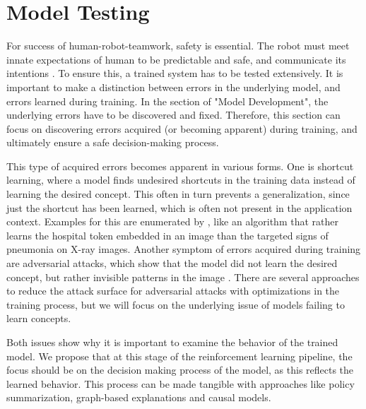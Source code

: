 \documentclass[twoside,11pt]{article}
\begin{document}
\section{Model Testing}
For success of human-robot-teamwork, safety is essential. The robot must meet innate expectations of human to be predictable and safe, and communicate its intentions \cite{EderHarperLeonards:2014:HITLRoboticsSafetyAssurance}. To ensure this, a trained system has to be tested extensively. It is important to make a distinction between errors in the underlying model, and errors learned during training. In the section of "Model Development", the underlying errors have to be discovered and fixed. Therefore, this section can focus on discovering errors acquired (or becoming apparent) during training, and ultimately ensure a safe decision-making process.

This type of acquired errors becomes apparent in various forms. One is shortcut learning, where a model finds undesired shortcuts in the training data instead of learning the desired concept. This often in turn prevents a generalization, since just the shortcut has been learned, which is often not present in the application context. Examples for this are enumerated by \citet{GeirhosEtAl:2020:ShortcutLearningDNN}, like an algorithm that rather learns the hospital token embedded in an image than the targeted signs of pneumonia on X-ray images.
Another symptom of errors acquired during training are adversarial attacks, which show that the model did not learn the desired concept, but rather invisible patterns in the image \citep{GoodfellowShlensSzegedy:2014:AdversarialExamples}. There are several approaches to reduce the attack surface for adversarial attacks with optimizations in the training process, but we will focus on the underlying issue of models failing to learn concepts.

Both issues show why it is important to examine the behavior of the trained model. We propose that at this stage of the reinforcement learning pipeline, the focus should be on the decision making process of the model, as this reflects the learned behavior. This process can be made tangible with approaches like policy summarization, graph-based explanations and causal models.

\end{document}
